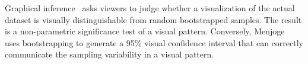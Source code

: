 Graphical inference~\cite{Buja2009, Wickham2013, Majumder2013} asks viewers to judge whether a visualization of the actual dataset is visually distinguishable from random bootstrapped samples. The result is a non-parametric significance test of a visual pattern. Conversely, Menjoge~\cite{Menjoge2010} uses bootstrapping to generate a 95\% visual confidence interval that can correctly communicate the sampling variability in a visual pattern. 

